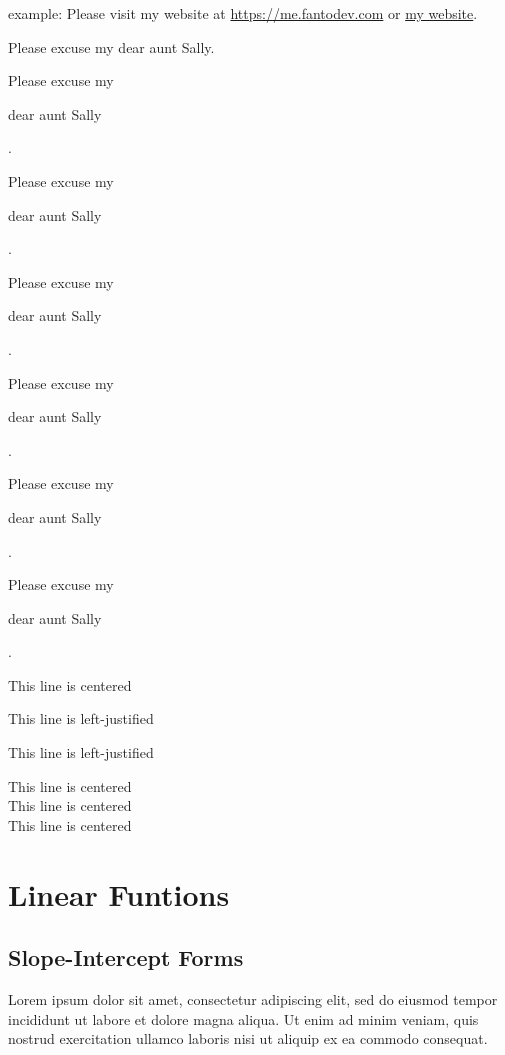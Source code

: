 \documentclass[12pt, a4paper]{article}
\newcommand\shortlorem{Lorem ipsum dolor sit amet, consectetur adipiscing elit, sed do eiusmod tempor incididunt ut labore et dolore magna aliqua. Ut enim ad minim veniam, quis nostrud exercitation ullamco laboris nisi ut aliquip ex ea commodo consequat.}
\begin{document}
example: Please visit my website at \url{https://me.fantodev.com} or
\href{https://next.fantodev.com}{my website}.

\vspace*{1cm}
Please excuse my dear aunt Sally.

Please excuse my \begin{Large}dear aunt Sally\end{Large}.

Please excuse my \begin{huge}dear aunt Sally\end{huge}.


Please excuse my \begin{normalsize}dear aunt Sally\end{normalsize}.

Please excuse my \begin{small}dear aunt Sally\end{small}.

Please excuse my \begin{scriptsize}dear aunt Sally\end{scriptsize}.

Please excuse my \begin{tiny}dear aunt Sally\end{tiny}.

\vspace*{1cm}

\begin{center} This line is centered \end{center}
\begin{flushleft} This line is left-justified \end{flushleft}
\begin{flushright} This line is left-justified \end{flushright}


\centering
This line is centered\\
This line is centered\\
This line is centered

\flushleft

\section{Linear Funtions}
        \subsection{Slope-Intercept Forms}
                \shortlorem
\end{document}
